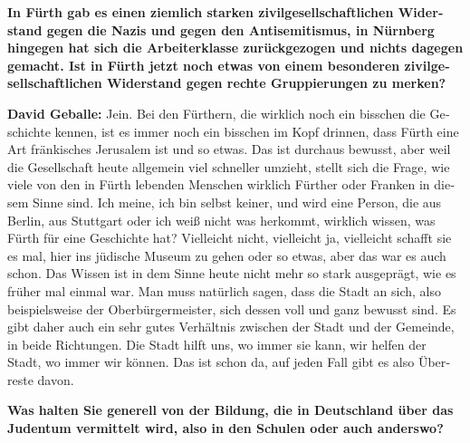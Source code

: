 \begin{otherlanguage}{ngerman}
\textbf{In Fürth gab es einen ziemlich starken zivilgesellschaftlichen Widerstand gegen die Nazis und gegen den Antisemitismus, in Nürnberg hingegen hat sich die Arbeiterklasse zurückgezogen und nichts dagegen gemacht. Ist in Fürth jetzt noch etwas von einem besonderen zivilgesellschaftlichen Widerstand gegen rechte Gruppierungen zu merken?} 

\textbf{David Geballe:} Jein. Bei den Fürthern, die wirklich noch ein bisschen die Geschichte kennen, ist es immer noch ein bisschen im Kopf drinnen, dass Fürth eine Art fränkisches Jerusalem ist und so etwas. Das ist durchaus bewusst, aber weil die Gesellschaft heute allgemein viel schneller umzieht, stellt sich die Frage, wie viele von den in Fürth lebenden Menschen wirklich Fürther oder Franken in diesem Sinne sind. Ich meine, ich bin selbst keiner, und wird eine Person, die aus Berlin, aus Stuttgart oder ich weiß nicht was herkommt, wirklich wissen, was Fürth für eine Geschichte hat? Vielleicht nicht, vielleicht ja, vielleicht schafft sie es mal, hier ins jüdische Museum zu gehen oder so etwas, aber das war es auch schon. Das Wissen ist in dem Sinne heute nicht mehr so stark ausgeprägt, wie es früher mal einmal war. Man muss natürlich sagen, dass die Stadt an sich, also beispielsweise der Oberbürgermeister, sich dessen voll und ganz bewusst sind. Es gibt daher auch ein sehr gutes Verhältnis zwischen der Stadt und der Gemeinde, in beide Richtungen. Die Stadt hilft uns, wo immer sie kann, wir helfen der Stadt, wo immer wir können. Das ist schon da, auf jeden Fall gibt es also Überreste davon. 



\textbf{Was halten Sie generell von der Bildung, die in Deutschland über das Judentum vermittelt wird, also in den Schulen oder auch anderswo?} 


\end{otherlanguage}
